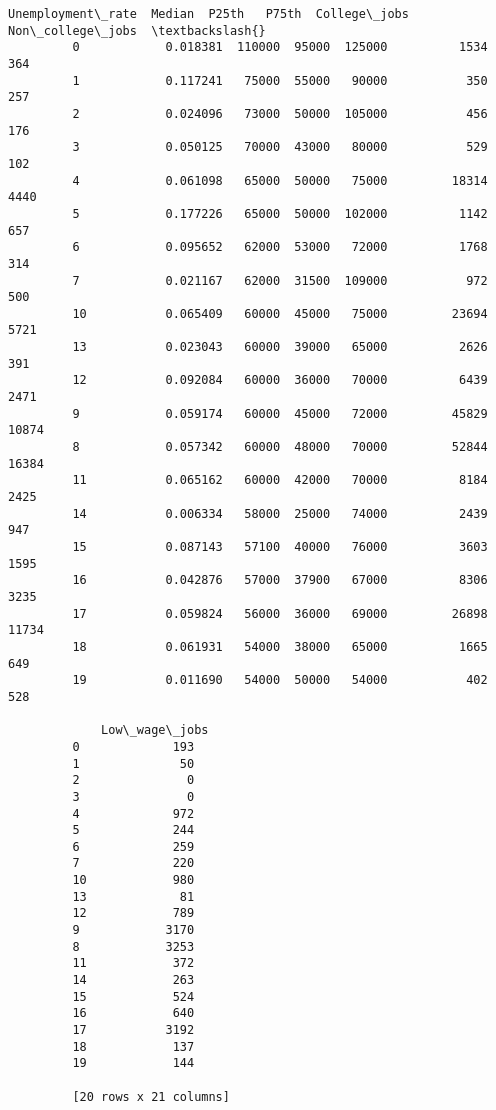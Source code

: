 \documentclass[11pt]{article}
\begin{document}
\begin{Verbatim}[commandchars=\\\{\}]
             Unemployment\_rate  Median  P25th   P75th  College\_jobs  Non\_college\_jobs  \textbackslash{}
         0            0.018381  110000  95000  125000          1534               364   
         1            0.117241   75000  55000   90000           350               257   
         2            0.024096   73000  50000  105000           456               176   
         3            0.050125   70000  43000   80000           529               102   
         4            0.061098   65000  50000   75000         18314              4440   
         5            0.177226   65000  50000  102000          1142               657   
         6            0.095652   62000  53000   72000          1768               314   
         7            0.021167   62000  31500  109000           972               500   
         10           0.065409   60000  45000   75000         23694              5721   
         13           0.023043   60000  39000   65000          2626               391   
         12           0.092084   60000  36000   70000          6439              2471   
         9            0.059174   60000  45000   72000         45829             10874   
         8            0.057342   60000  48000   70000         52844             16384   
         11           0.065162   60000  42000   70000          8184              2425   
         14           0.006334   58000  25000   74000          2439               947   
         15           0.087143   57100  40000   76000          3603              1595   
         16           0.042876   57000  37900   67000          8306              3235   
         17           0.059824   56000  36000   69000         26898             11734   
         18           0.061931   54000  38000   65000          1665               649   
         19           0.011690   54000  50000   54000           402               528   
         
             Low\_wage\_jobs  
         0             193  
         1              50  
         2               0  
         3               0  
         4             972  
         5             244  
         6             259  
         7             220  
         10            980  
         13             81  
         12            789  
         9            3170  
         8            3253  
         11            372  
         14            263  
         15            524  
         16            640  
         17           3192  
         18            137  
         19            144  
         
         [20 rows x 21 columns]
\end{Verbatim}
            
\end{document}
